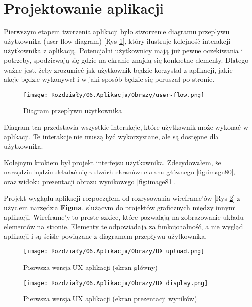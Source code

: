 \section{Projektowanie aplikacji}

Pierwszym etapem tworzenia aplikacji było stworzenie diagramu przepływu użytkownika (user flow diagram) [Rys \ref{fig:image82}], który ilustruje kolejność interakcji użytkownika z aplikacją. Potencjalni użytkownicy mają już pewne oczekiwania i potrzeby, spodziewają się gdzie na ekranie znajdą się konkretne elementy. Dlatego ważne jest, żeby zrozumieć jak użytkownik będzie korzystał z aplikacji, jakie akcje będzie wykonywał i w jaki sposób będzie się poruszał po stronie.

\begin{figure}[ht]
    \centering
    \texttt{[image: Rozdziały/06.Aplikacja/Obrazy/user-flow.png]}  
    \caption{Diagram przepływu użytkownika}
    \label{fig:image82}
\end{figure}

Diagram ten przedstawia wszystkie interakcje, które użytkownik może wykonać w aplikacji. Te interakcje nie muszą być wykorzystane, ale są dostępne dla użytkownika.

Kolejnym krokiem był projekt interfejsu użytkownika. Zdecydowałem, że narzędzie będzie składać się z dwóch ekranów: ekranu głównego \ref{fig:image80}, oraz widoku prezentacji obrazu wynikowego \ref{fig:image81}.

Projekt wyglądu aplikacji rozpocząłem od rozrysowania wireframe'ów [Rys \ref{fig:image83}] z użyciem narzędzia \textbf{Figma}, służącym do projektów graficznych między innymi aplikacji. Wireframe'y to proste szkice, które pozwalają na zobrazowanie układu elementów na stronie. Elementy te odpowiadają za funkcjonalność, a nie wygląd aplikacji i są ściśle powiązane z diagramem przepływu użytkownika.

\begin{figure}[ht]
    \centering
    \texttt{[image: Rozdziały/06.Aplikacja/Obrazy/UX upload.png]}  
    \caption{Pierwsza wersja UX aplikacji (ekran główny)}
    \label{fig:image83}
\end{figure}

\begin{figure}[ht]
    \centering
    \texttt{[image: Rozdziały/06.Aplikacja/Obrazy/UX display.png]}  
    \caption{Pierwsza wersja UX aplikacji (ekran prezentacji wyników)}
    \label{fig:image84}
\end{figure}

